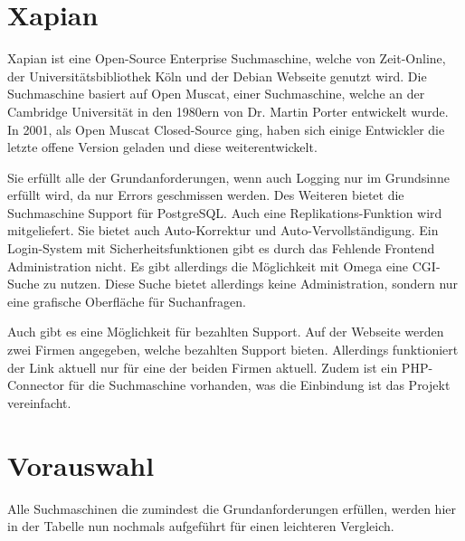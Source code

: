 \section{Xapian}
\label{xapian}

Xapian ist eine Open-Source Enterprise Suchmaschine, welche von Zeit-Online, der Universitätsbibliothek Köln und der Debian Webseite genutzt wird. Die Suchmaschine basiert auf Open Muscat, einer Suchmaschine, welche an der Cambridge Universität in den 1980ern von Dr. Martin Porter entwickelt wurde. In 2001, als Open Muscat Closed-Source ging, haben sich einige Entwickler die letzte offene Version geladen und diese weiterentwickelt.

Sie erfüllt alle der Grundanforderungen, wenn auch Logging nur im Grundsinne erfüllt wird, da nur Errors geschmissen werden. Des Weiteren bietet die Suchmaschine Support für PostgreSQL. Auch eine Replikations-Funktion wird mitgeliefert. Sie bietet auch Auto-Korrektur und Auto-Vervollständigung. Ein Login-System mit Sicherheitsfunktionen gibt es durch das Fehlende Frontend Administration nicht. Es gibt allerdings die Möglichkeit mit Omega eine CGI-Suche zu nutzen. Diese Suche bietet allerdings keine Administration, sondern nur eine grafische Oberfläche für Suchanfragen.

Auch gibt es eine Möglichkeit für bezahlten Support. Auf der Webseite werden zwei Firmen angegeben, welche bezahlten Support bieten. Allerdings funktioniert der Link aktuell nur für eine der beiden Firmen aktuell. Zudem ist ein PHP-Connector für die Suchmaschine vorhanden, was die Einbindung ist das Projekt vereinfacht. \cite{XAP.2019}

\section {Vorauswahl}

Alle Suchmaschinen die zumindest die Grundanforderungen erfüllen, werden hier in der Tabelle nun nochmals aufgeführt für einen leichteren Vergleich. 


